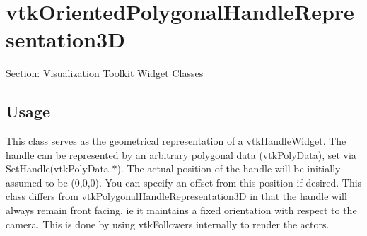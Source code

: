 \begin{DoxyItemize}
\end{DoxyItemize}\hypertarget{vtkwidgets_vtkorientedpolygonalhandlerepresentation3d}{}\section{vtk\-Oriented\-Polygonal\-Handle\-Representation3\-D}\label{vtkwidgets_vtkorientedpolygonalhandlerepresentation3d}
Section\-: \hyperlink{sec_vtkwidgets}{Visualization Toolkit Widget Classes} \hypertarget{vtkwidgets_vtkxyplotwidget_Usage}{}\subsection{Usage}\label{vtkwidgets_vtkxyplotwidget_Usage}
This class serves as the geometrical representation of a vtk\-Handle\-Widget. The handle can be represented by an arbitrary polygonal data (vtk\-Poly\-Data), set via Set\-Handle(vtk\-Poly\-Data $\ast$). The actual position of the handle will be initially assumed to be (0,0,0). You can specify an offset from this position if desired. This class differs from vtk\-Polygonal\-Handle\-Representation3\-D in that the handle will always remain front facing, ie it maintains a fixed orientation with respect to the camera. This is done by using vtk\-Followers internally to render the actors.

